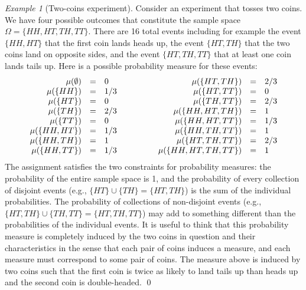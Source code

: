 \documentclass{article}
\theoremstyle{remark}
\newtheorem{example}{Example}
\newcommand{\pmeas}{\ensuremath{\mu}}
\begin{document}
\begin{example}[Two-coins experiment]\label{ex1}
  Consider an experiment that tosses two coins. We have four possible
  outcomes that constitute the sample space
  $\Omega = \{ HH, HT, TH, TT \}$. There are 16 total events including
  for example the event $\{ HH, HT \}$ that the first coin lands heads
  up, the event $\{ HT, TH \}$ that the two coins land on opposite
  sides, and the event $\{ HT, TH, TT\}$ that at least one coin lands
  tails up. Here is a possible probability measure for these events:
\[\begin{array}{c@{\qquad\qquad}c}
\begin{array}{rcl}
\pmeas(\emptyset) &=& 0 \\
\pmeas(\{ HH \}) &=& 1/3 \\
\pmeas(\{ HT \}) &=& 0 \\
\pmeas(\{ TH \}) &=& 2/3 \\
\pmeas(\{ TT \}) &=& 0 \\
\pmeas(\{  HH, HT \}) &=& 1/3 \\
\pmeas(\{  HH, TH \}) &=& 1 \\
\pmeas(\{  HH , TT \}) &=& 1/3 
\end{array} & \begin{array}{rcl}
\pmeas(\{  HT, TH \}) &=& 2/3 \\
\pmeas(\{  HT , TT \}) &=& 0 \\
\pmeas(\{  TH , TT \}) &=& 2/3 \\
\pmeas(\{  HH, HT, TH \}) &=& 1 \\
\pmeas(\{  HH, HT, TT \}) &=& 1/3 \\
\pmeas(\{  HH, TH, TT \}) &=& 1 \\
\pmeas(\{  HT, TH, TT \}) &=& 2/3 \\
\pmeas(\{  HH, HT, TH, TT \}) &=& 1
\end{array}
  \end{array}\]
  The assignment satisfies the two constraints for probability measures:
  the probability of the entire sample space is 1, and the probability
  of every collection of disjoint events (e.g.,
  $\{ HT \} \cup \{ TH \} = \{ HT, TH \}$) is the sum of the individual
  probabilities. The probability of collections of non-disjoint events
  (e.g., $\{ HT, TH \} \cup \{ TH , TT \} = \{ HT, TH, TT \}$) may add
  to something different than the probabilities of the individual
  events. It is useful to think that this probability measure is
  completely induced by the two coins in question and their
  characteristics in the sense that each pair of coins induces a
  measure, and each measure must correspond to some pair of coins.  The
  measure above is induced by two coins such that the first coin is
  twice as likely to land tails up than heads up and the second coin is
  double-headed.  
  \qed\end{example}
\end{document}
